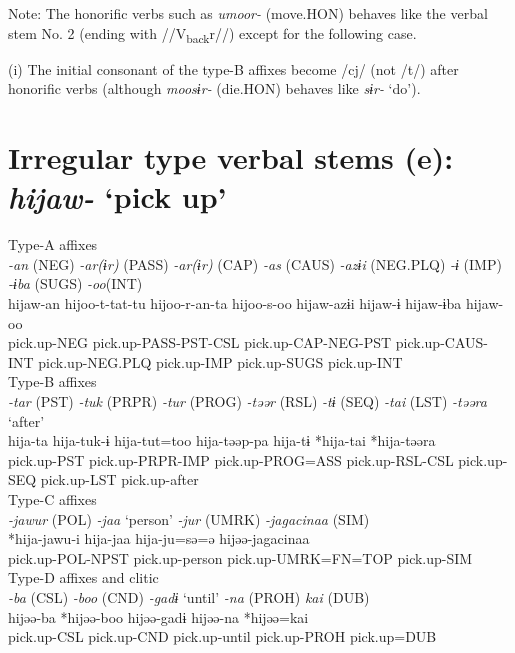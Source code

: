 Note: The honorific verbs such as \textit{umoor-} (move.HON) behaves like the verbal stem No. 2 (ending with //V\textsubscript{back}r//) except for the following case.

(i)  The initial consonant of the type-B affixes become /cj/ (not /t/) after honorific verbs (although \textit{moosɨr-} (die.HON) behaves like \textit{sɨr-} ‘do’).

\section{Irregular type verbal stems (e): \textit{hijaw-} ‘pick up’}

\ea Type-A affixes\\
\glll \textit{-an} (NEG)  \textit{-ar(ɨr)} (PASS)  \textit{-ar(ɨr)} (CAP)  \textit{-as} (CAUS)  \textit{-azɨi} (NEG.PLQ)  \textit{-ɨ} (IMP)  \textit{-ɨba} (SUGS)  \textit{-oo}(INT)\\
hijaw-an  hijoo-t-tat-tu  hijoo-r-an-ta  hijoo-s-oo  hijaw-azɨi  hijaw-ɨ  hijaw-ɨba  hijaw-oo\\
pick.up-NEG  pick.up-PASS-PST-CSL  pick.up-CAP-NEG-PST  pick.up-CAUS-INT  pick.up-NEG.PLQ  pick.up-IMP  pick.up-SUGS  pick.up-INT\\


\ex Type-B affixes\\
\glll \textit{-tar} (PST)  \textit{-tuk} (PRPR)  \textit{-tur} (PROG)  \textit{-təər} (RSL)  \textit{-tɨ} (SEQ)  \textit{-tai} (LST)  \textit{-təəra} ‘after’\\
hija-ta  hija-tuk-ɨ  hija-tut=too  hija-təəp-pa  hija-tɨ  *hija-tai  *hija-təəra\\
pick.up-PST  pick.up-PRPR-IMP  pick.up-PROG=ASS  pick.up-RSL-CSL  pick.up-SEQ  pick.up-LST  pick.up-after\\


\ex Type-C affixes\\
\glll \textit{-jawur} (POL)  \textit{-jaa} ‘person’  \textit{-jur} (UMRK)  \textit{-jagacinaa} (SIM)\\
*hija-jawu-i  hija-jaa  hija-ju=sə=ə  hijəə-jagacinaa\\
pick.up-POL-NPST  pick.up-person  pick.up-UMRK=FN=TOP  pick.up-SIM\\


\ex Type-D affixes and clitic\\
\glll \textit{-ba} (CSL)  \textit{-boo} (CND)  \textit{-gadɨ} ‘until’  \textit{-na} (PROH)  \textit{kai} (DUB)\\
hijəə-ba  *hijəə-boo  hijəə-gadɨ  hijəə-na  *hijəə=kai\\
pick.up-CSL  pick.up-CND  pick.up-until  pick.up-PROH  pick.up=DUB\\
\z

